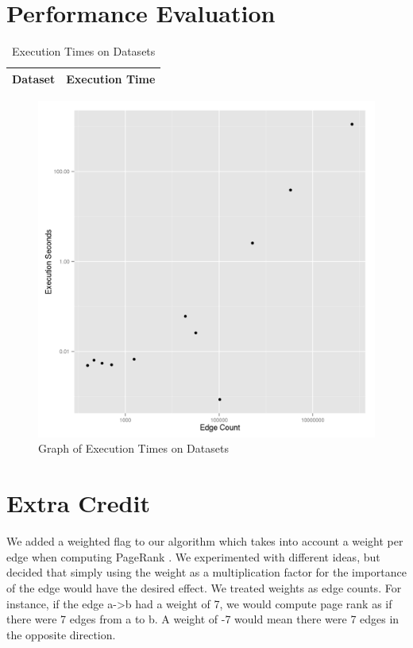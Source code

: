 \documentclass[draft]{report}
\newcommand{\pagerank}{PageRank }
\begin{document}
\section{Performance Evaluation}
\begin{table}
  \centering
  \begin{tabular}{ll}
    \toprule
    Dataset & Execution Time\\
    \midrule
    \bottomrule
  \end{tabular}
  \caption{Execution Times on Datasets}
  \label{execution-times-table}
\end{table}
\begin{figure}
  \centering
  \includegraphics[scale=0.5]{performance.png}
  \caption{Graph of Execution Times on Datasets}
  \label{execution-times-graph}
\end{figure}

\section{Extra Credit}
We added a weighted flag to our algorithm which takes into account a weight per
edge when computing \pagerank. We experimented with different ideas, but decided
that simply using the weight as a multiplication factor for the importance of
the edge would have the desired effect. We treated weights as edge counts.  For
instance, if the edge a->b had a weight of 7, we would compute page rank as if
there were 7 edges from a to b. A weight of -7 would mean there were 7 edges in
the opposite direction.
\end{document}
